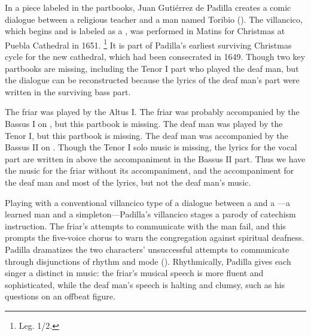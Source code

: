 In a piece labeled  in the partbooks, Juan Gutiérrez de Padilla creates a comic dialogue between a religious teacher and a  man named Toribio ().
The villancico, which begins  and is labeled as a , was performed in Matins for Christmas at Puebla Cathedral in 1651.%
\footnote{\signature{MEX-Pc}{Leg. 1/2}.}
It is part of Padilla's earliest surviving Christmas cycle for the new cathedral, which had been consecrated in 1649.
Though two key partbooks are missing, including the Tenor I part who played the deaf man, but the dialogue can be reconstructed because the lyrics of the deaf man's part were written in the surviving bass part.%
\begin{Footnote}
    The friar was played by the Altus I. 
    The friar was probably accompanied by the Bassus I on , but this partbook is missing.
    The deaf man was played by the Tenor I, but this partbook is missing.
    The deaf man was accompanied by the Bassus II on .
    Though the Tenor I solo music is missing, the lyrics for the vocal part are written in above the accompaniment in the Bassus II part. 
    Thus we have the music for the friar without its accompaniment, and the accompaniment for the deaf man and most of the lyrics, but not the deaf man's music.
\end{Footnote}


Playing with a conventional villancico type of a dialogue between a  and a ---a learned man and a simpleton---Padilla's villancico stages a parody of catechism instruction.
The friar's attempts to communicate with the  man fail, and this prompts the five-voice chorus to warn the congregation against spiritual deafness.
Padilla dramatizes the two characters' unsuccessful attempts to communicate through disjunctions of rhythm and mode ().
Rhythmically, Padilla gives each singer a distinct  in music: the friar's musical speech is more fluent and sophisticated, while the deaf man's speech is halting and clumsy, such as his questions  on an offbeat figure.

